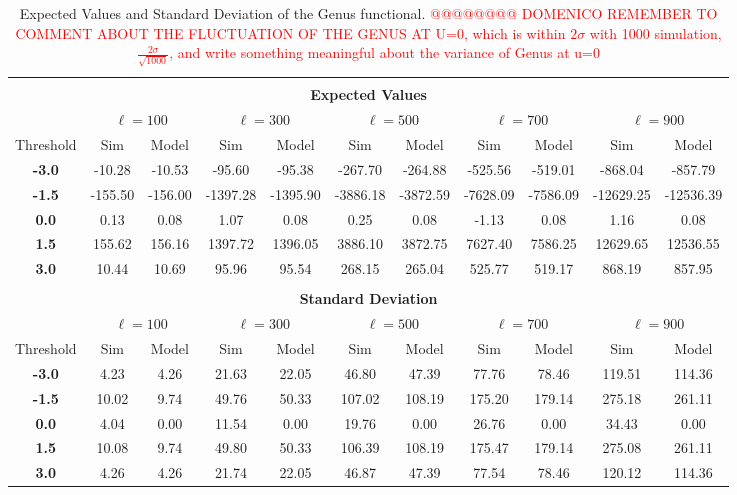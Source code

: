 \documentclass[aps,prd,showpacs,superscriptaddress,groupedaddress]{revtex4-1}  %
\begin{document}
\begin{table}
\centering
\begin{tabular}{|c||c|c|c|c|c|c|c|c|c|c|}
\multicolumn{11}{c}{} \\
\multicolumn{11}{c}{\textbf{Expected Values}} \\ 
\hline 
& \multicolumn{2}{c|}{$\ell=100$} & \multicolumn{2}{c|}{$\ell=300$} & \multicolumn{2}{c|}{$\ell=500$} & \multicolumn{2}{c|}{$\ell=700$} & \multicolumn{2}{c|}{$\ell=900$}\\ 
 \hline
Threshold & Sim & Model & Sim & Model & Sim & Model & Sim & Model & Sim & Model\\ 
 \hline
\textbf{-3.0} & -10.28 & -10.53 & -95.60 & -95.38 & -267.70 & -264.88 & -525.56 & -519.01 & -868.04 & -857.79\\
\textbf{-1.5} & -155.50 & -156.00 & -1397.28 & -1395.90 & -3886.18 & -3872.59 & -7628.09 & -7586.09 & -12629.25 & -12536.39\\
\textbf{0.0} & 0.13 & 0.08 & 1.07 & 0.08 & 0.25 & 0.08 & -1.13 & 0.08 & 1.16 & 0.08\\
\textbf{1.5} & 155.62 & 156.16 & 1397.72 & 1396.05 & 3886.10 & 3872.75 & 7627.40 & 7586.25 & 12629.65 & 12536.55\\
\textbf{3.0} & 10.44 & 10.69 & 95.96 & 95.54 & 268.15 & 265.04 & 525.77 & 519.17 & 868.19 & 857.95\\
\hline 
\multicolumn{11}{c}{} \\
\multicolumn{11}{c}{\textbf{Standard Deviation}} \\ 
\hline 
& \multicolumn{2}{c|}{$\ell=100$} & \multicolumn{2}{c|}{$\ell=300$} & \multicolumn{2}{c|}{$\ell=500$} & \multicolumn{2}{c|}{$\ell=700$} & \multicolumn{2}{c|}{$\ell=900$}\\ 
 \hline
Threshold & Sim & Model & Sim & Model & Sim & Model & Sim & Model & Sim & Model\\ 
 \hline
\textbf{-3.0} & 4.23 & 4.26 & 21.63 & 22.05 & 46.80 & 47.39 & 77.76 & 78.46 & 119.51 & 114.36\\
\textbf{-1.5} & 10.02 & 9.74 & 49.76 & 50.33 & 107.02 & 108.19 & 175.20 & 179.14 & 275.18 & 261.11\\
\textbf{0.0} & 4.04 & 0.00 & 11.54 & 0.00 & 19.76 & 0.00 & 26.76 & 0.00 & 34.43 & 0.00\\
\textbf{1.5} & 10.08 & 9.74 & 49.80 & 50.33 & 106.39 & 108.19 & 175.47 & 179.14 & 275.08 & 261.11\\
\textbf{3.0} & 4.26 & 4.26 & 21.74 & 22.05 & 46.87 & 47.39 & 77.54 & 78.46 & 120.12 & 114.36\\
\hline 
\end{tabular} \\
\caption{Expected Values and Standard Deviation of the Genus functional.
\textcolor{red}{@@@@@@@@ DOMENICO REMEMBER TO COMMENT ABOUT THE FLUCTUATION OF THE GENUS AT U=0, which is within $2\sigma$ with 1000 simulation,  $\frac{2\sigma}{\sqrt{1000}}$, and write something meaningful about the variance of Genus at u=0}
} \\
\label{tab:genus_mean} \\
\end{table}
\end{document}
